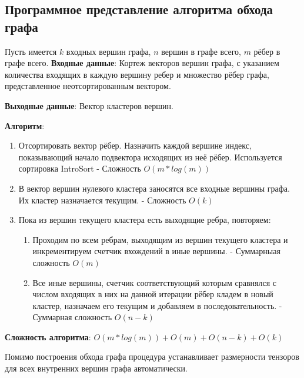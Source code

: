 \subsection{Программное представление алгоритма обхода графа}
Пусть имеется $k$ входных вершин графа, $n$ вершин в графе всего, $m$ рёбер в графе всего.
\textbf{Входные данные}: Кортеж векторов вершин графа, с указанием количества входящих в каждую вершину ребер и множество рёбер графа, представленное неотсортированным вектором.
\par
\textbf{Выходные данные}: Вектор кластеров вершин.
\par
\textbf{Алгоритм}: \begin{enumerate}
    \item Отсортировать вектор рёбер. Назначить каждой вершине индекс, показывающий начало подвектора исходящих из неё рёбер. Используется сортировка IntroSort - Сложность $O(m*log(m))$
    \item В вектор вершин нулевого кластера заносятся все входные вершины графа. Их кластер назначается текущим. - Сложность $O(k)$
    \item Пока из вершин текущего кластера есть выходящие ребра, повторяем:
    \begin{enumerate}
        \item Проходим по всем ребрам, выходящим из вершин текущего кластера и инкрементируем счетчик вхождений в иные вершины. - Суммарныая сложность $O(m)$
        \item Все иные вершины, счетчик соответствующий которым сравнялся с числом входящих в них на данной итерации рёбер кладем в новый кластер, назначаем его текущим и добавляем в последовательность. - Суммарная сложность $O(n-k)$
    \end{enumerate}
\end{enumerate}
\par
\textbf{Сложность алгоритма}: $O(m*log(m)) + O(m) + O(n-k) + O(k)$
\par
Помимо построения обхода графа процедура устанавливает размерности тензоров для всех внутренних вершин графа автоматически.